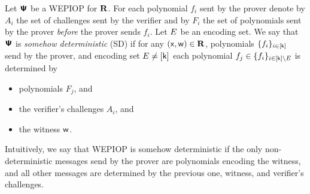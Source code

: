 \documentclass[runningheads,11pt]{llncs}
\begin{document}
\begin{definition}
  \label{def:sdwepiop}
  Let $\bm{\mathsf{\Psi}}$ be a WEPIOP for $\mathbf{R}$. For each polynomial $f_i$ sent by the prover
  denote by $A_i$ the set of challenges sent by the verifier and by $F_i$ the
  set of polynomials sent by the prover \emph{before} the prover sends
  $f_i$. Let $E$ be an encoding set. We say that $\bm{\mathsf{\Psi}}$ is \emph{somehow
    deterministic} (SD) if for any $(\mathsf{x}, \mathsf{w}) \in \mathbf{R}$, polynomials
  $\{f_i\}_{i \in [\mathsf{k}]}$ send by the prover, and encoding set
  $E \neq [\mathsf{k}]$ each polynomial
  $f_j \in \{f_i\}_{i \in [\mathsf{k}] \setminus E}$ is determined by
  \begin{itemize}
    \item polynomials $F_j$, and
    \item the verifier's challenges $A_i$, and
    \item the witness $\mathsf{w}$.
  \end{itemize}
\end{definition}
Intuitively, we say that WEPIOP is somehow deterministic if the only
non-deterministic messages send by the prover are polynomials encoding the
witness, and all other messages are determined by the previous one, witness, and
verifier's challenges.
\end{document}
